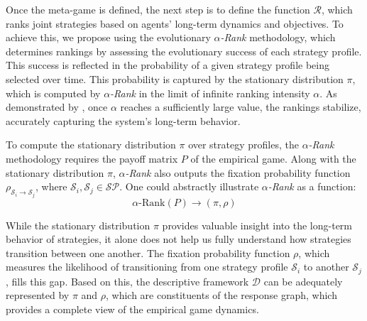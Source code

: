 \begin{flushleft}
\begin{flushleft}
        Once the meta-game is defined, the next step is to define the function $\mathcal{R}$, which ranks joint strategies based on agents' long-term dynamics and objectives. To achieve this, we propose using the evolutionary \emph{$\alpha$-Rank} methodology, which determines rankings by assessing the evolutionary success of each strategy profile. This success is reflected in the probability of a given strategy profile being selected over time. This probability is captured by the stationary distribution $\pi$, which is computed by \emph{$\alpha$-Rank} in the limit of infinite ranking intensity $\alpha$. As demonstrated by \cite{omidshafiei2019alpharank}, once $\alpha$ reaches a sufficiently large value, the rankings stabilize, accurately capturing the system's long-term behavior.

        To compute the stationary distribution $\pi$ over strategy profiles, the \emph{$\alpha$-Rank} methodology requires the payoff matrix $P$ of the empirical game. Along with the stationary distribution $\pi$, \emph{$\alpha$-Rank} also outputs the fixation probability function $\rho_{\mathcal{S}_i \to \mathcal{S}_j}$, where $\mathcal{S}_i, \mathcal{S}_j \in \mathcal{SP}$. One could abstractly illustrate \emph{$\alpha$-Rank} as a function:
        \begin{equation}
            \alpha\text{-Rank}(P) \rightarrow (\pi, \rho) 
            \label{eq:abstract_arank}
        \end{equation}

        While the stationary distribution $\pi$ provides valuable insight into the long-term behavior of strategies, it alone does not help us fully understand how strategies transition between one another. The fixation probability function $\rho$, which measures the likelihood of transitioning from one strategy profile $\mathcal{S}_i$ to another $\mathcal{S}_j$, fills this gap. Based on this, the descriptive framework $\mathcal{D}$ can be adequately represented by $\pi$ and $\rho$, which are constituents of the response graph, which provides a complete view of the empirical game dynamics.\\~\\


\end{flushleft}
\end{flushleft}
